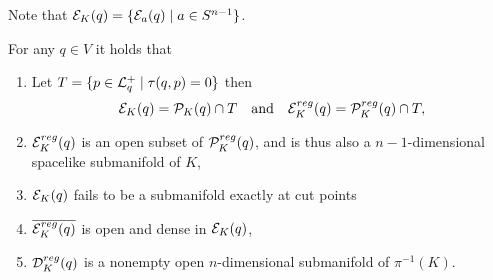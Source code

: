 Note that ${\mathcal{E}}_K(q) = \{ {\mathcal{E}}_a(q) \mid a\in {S^{n-1}} \}$.
\begin{proposition}\label{prop:submanifolds}
For any $q\in V$ it holds that
\begin{enumerate}[label={\textnormal{(\arabic*)}}]
    \item Let $T=\{p\in {\mathcal{L}}^+_q \mid \tau(q,p)=0\}$ then 
    \[
        {\mathcal{E}}_K(q) = {\mathcal{P}}_K(q) \cap T \quad \text{and} \quad {\mathcal{E}}^{reg}_K(q) = {\mathcal{P}}^{reg}_K(q) \cap T,
    \]
    \item  ${\mathcal{E}}^{reg}_K(q)$ is an open subset of ${\mathcal{P}}^{reg}_K(q)$, and is thus also a $n-1$-dimensional spacelike submanifold of $K$,
    \item ${\mathcal{E}}_K(q)$ fails to be a submanifold exactly at cut points
    \item $\overline{{\mathcal{E}}^{reg}_K(q)}$ is open and dense in ${\mathcal{E}}_K(q)$,
    \item ${\mathcal{D}}^{reg}_K(q)$ is a nonempty open $n$-dimensional submanifold of $\pi^{-1}(K)$.
\end{enumerate}
\end{proposition}
